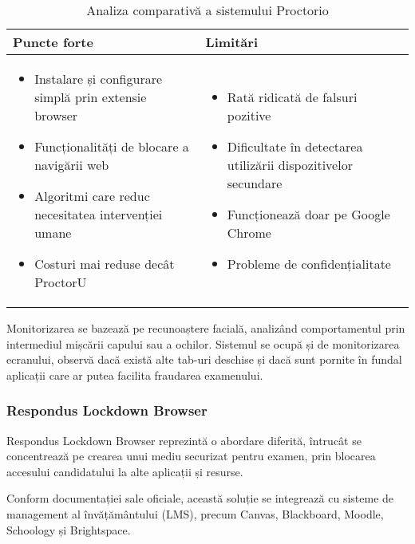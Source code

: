 \documentclass[12pt,a4paper]{article}
\begin{document}
\begin{table}[H]
\centering
\begin{tabular}{|p{7.5cm}|p{7.5cm}|}
\hline
\textbf{Puncte forte} & \textbf{Limitări} \\
\hline
\begin{itemize}
    \item Instalare și configurare simplă prin extensie browser
    \item Funcționalități de blocare a navigării web
    \item Algoritmi care reduc necesitatea intervenției umane
    \item Costuri mai reduse decât ProctorU
\end{itemize} & 
\begin{itemize}
    \item Rată ridicată de falsuri pozitive
    \item Dificultate în detectarea utilizării dispozitivelor secundare
    \item Funcționează doar pe Google Chrome
    \item Probleme de confidențialitate
\end{itemize} \\
\hline
\end{tabular}
\caption{Analiza comparativă a sistemului Proctorio}
\end{table}

Monitorizarea se bazează pe recunoaștere facială, analizând comportamentul prin 
intermediul mișcării capului sau a ochilor. Sistemul se ocupă și de monitorizarea 
ecranului, observă dacă există alte tab-uri deschise și dacă sunt pornite în fundal 
aplicații care ar putea facilita fraudarea examenului.

\subsubsection{Respondus Lockdown Browser}
Respondus Lockdown Browser reprezintă o abordare diferită, 
întrucât se concentrează pe crearea unui mediu securizat pentru examen,
prin blocarea accesului candidatului la alte aplicații și resurse.

Conform documentației sale oficiale\cite{respondus}, această soluție se
integrează cu sisteme de management al învățământului (LMS), precum Canvas,
Blackboard, Moodle, Schoology și Brightspace.
\end{document}
